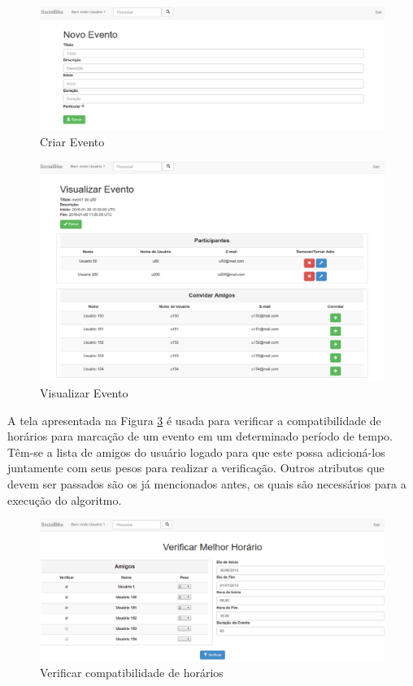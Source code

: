 \newpage
\begin{figure}[!h]
	\centering
	\includegraphics[scale=0.45]{figuras/resultados/criar_evento.eps}
	\caption[Criar Evento]{Criar Evento}
	\label{criar_evento}
\end{figure}

\begin{figure}[!h]
	\centering
	\includegraphics[scale=0.45]{figuras/resultados/evento.eps}
	\caption[Visualizar Evento]{Visualizar Evento}
	\label{evento}
\end{figure}

A tela apresentada na Figura \ref{compatibilidade_horarios} é usada para verificar a compatibilidade de horários para marcação de um evento em um determinado período de tempo. Têm-se a lista de amigos do usuário logado para que este possa adicioná-los juntamente com seus pesos para realizar a verificação. Outros atributos que devem ser passados são os já mencionados antes, os quais são necessários para a execução do algoritmo.

\newpage
\begin{figure}[!h]
	\centering
	\includegraphics[scale=0.45]{figuras/resultados/compatibilidade_horarios.eps}
	\caption[Verificar compatibilidade de horários]{Verificar compatibilidade de horários}
	\label{compatibilidade_horarios}
\end{figure}

